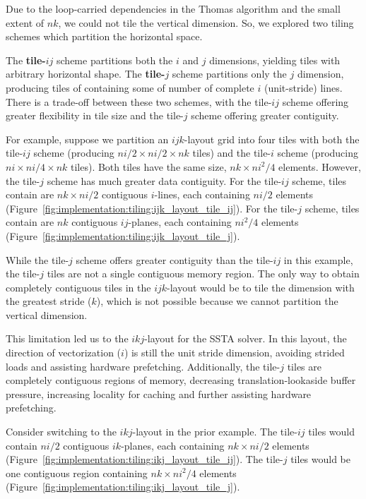 \documentclass{sig-alternate-05-2015}
\begin{document}
Due to the loop-carried dependencies in the Thomas algorithm and the small
  extent of \(nk\), we could not tile the vertical dimension. So, we explored two
  tiling schemes which partition the horizontal space.

The \textbf{tile-\(ij\)} scheme partitions both the \(i\) and \(j\) dimensions,
  yielding tiles with arbitrary horizontal shape. 
The \textbf{tile-\(j\)} scheme partitions only the \(j\) dimension, producing
  tiles of containing some of number of complete \(i\) (unit-stride) lines.
There is a trade-off between these two schemes, with the tile-\(ij\) scheme
  offering greater flexibility in tile size and the tile-\(j\) scheme offering
  greater contiguity. 

For example, suppose we partition an \(ijk\)-layout grid into four tiles with
  both the tile-\(ij\) scheme (producing \(ni/2 \times ni/2 \times nk\) tiles)
  and the tile-\(i\) scheme (producing \(ni \times ni/4 \times nk\) tiles).
Both tiles have the same size, \(nk \times ni^2/4\) elements.
However, the tile-\(j\) scheme has much greater data contiguity.
For the tile-\(ij\) scheme, tiles contain are \(nk \times ni/2\) contiguous
  \(i\)-lines, each containing \(ni/2\) elements
  (Figure~\ref{fig:implementation:tiling:ijk_layout_tile_ij}).
For the tile-\(j\) scheme, tiles contain are \(nk\) contiguous \(ij\)-planes,
  each containing \(ni^2/4\) elements
  (Figure~\ref{fig:implementation:tiling:ijk_layout_tile_j}).

While the tile-\(j\) scheme offers greater contiguity than the
  tile-\(ij\) in this example, the tile-\(j\) tiles are not a single contiguous
  memory region.
The only way to obtain completely contiguous tiles in the \(ijk\)-layout would
  be to tile the dimension with the greatest stride (\(k\)), which is not possible
  because we cannot partition the vertical dimension.

This limitation led us to the \(ikj\)-layout for the SSTA solver.
In this layout, the direction of vectorization (\(i\)) is still the unit stride
  dimension, avoiding strided loads and assisting hardware prefetching.
Additionally, the tile-\(j\) tiles are completely contiguous regions of memory,
  decreasing translation-lookaside buffer pressure, increasing locality for
  caching and further assisting hardware prefetching.

Consider switching to the \(ikj\)-layout in the prior example.
The tile-\(ij\) tiles would contain \(ni/2\) contiguous \(ik\)-planes, each
  containing \(nk \times ni/2\) elements
  (Figure~\ref{fig:implementation:tiling:ikj_layout_tile_ij}).
The tile-\(j\) tiles would be one contiguous region containing
  \(nk \times ni^2/4\) elements
  (Figure~\ref{fig:implementation:tiling:ikj_layout_tile_j}).
\end{document}
